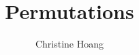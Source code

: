 \documentclass{article}
\title{Permutations}
\author{Christine Hoang}
\begin{document}
\maketitle

\section{}
\end{document}
